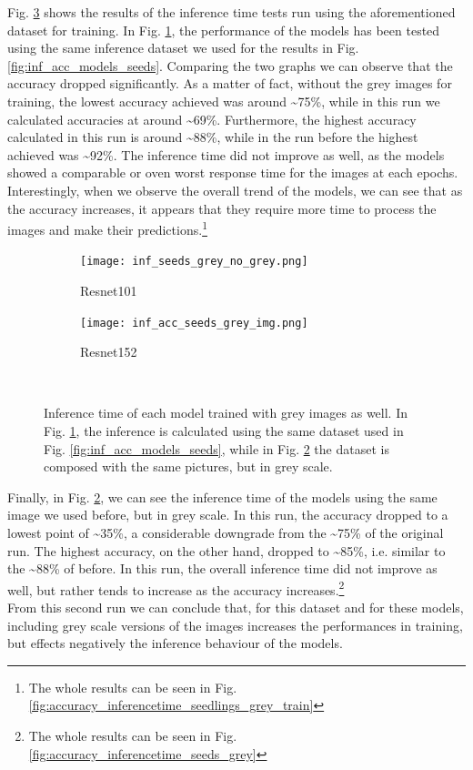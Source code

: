 Fig. \ref{fig:inf_seeds_with_grey} shows the results of the inference time tests run using the aforementioned dataset for training. In Fig. \ref{fig:inf_seeds_grey_no_grey}, the performance of the models has been tested using the same inference dataset we used for the results in Fig. \ref{fig:inf_acc_models_seeds}. Comparing the two graphs we can observe that the accuracy dropped significantly. As a matter of fact, without the grey images for training, the lowest accuracy achieved was around \textasciitilde75\%, while in this run we calculated accuracies at around \textasciitilde69\%. Furthermore, the highest accuracy calculated in this run is around \textasciitilde88\%,
while in the run before the highest achieved was \textasciitilde92\%. The inference time did not improve as well, as the models showed a comparable or oven worst response time for the images at each epochs. Interestingly, when we observe the overall trend of the models, we can see that as the accuracy increases, it appears that they require more time to process the images and make their predictions.\footnote{The whole results can be seen in Fig. \ref{fig:accuracy_inferencetime_seedlings_grey_train}}


\begin{figure}[h]
     \begin{subfigure}{0.5\textwidth}
	    \texttt{[image: inf\_seeds\_grey\_no\_grey.png]}
	    \caption{Resnet101}
         \label{fig:inf_seeds_grey_no_grey}
     \end{subfigure}
     \hfill
     \begin{subfigure}{0.5\textwidth}
	    \texttt{[image: inf\_acc\_seeds\_grey\_img.png]}
	    \caption{Resnet152}
        \label{fig:inf_acc_seeds_grey_img}
     \end{subfigure}\\
     \caption[Inference time of each model trained with grey images as well]{Inference time of each model trained with grey images as well. In Fig. \ref{fig:inf_seeds_grey_no_grey}, the inference is calculated using the same dataset used in Fig. \ref{fig:inf_acc_models_seeds}, while in Fig.  \ref{fig:inf_acc_seeds_grey_img} the dataset is composed with the same pictures, but in grey scale. }
        \label{fig:inf_seeds_with_grey}
\end{figure}


Finally, in Fig. \ref{fig:inf_acc_seeds_grey_img}, we can see the inference time of the models using the same image we used before, but in grey scale. In this run, the accuracy dropped to a lowest point of \textasciitilde35\%, a considerable downgrade from the \textasciitilde75\% of the original run. The highest accuracy, on the other hand, dropped to \textasciitilde85\%, i.e. similar to the \textasciitilde88\% of before. In this run, the overall inference time did not improve as well, but rather tends to increase as the accuracy increases.\footnote{The whole results can be seen in Fig. \ref{fig:accuracy_inferencetime_seeds_grey}} \\ 
From this second run we can conclude that, for this dataset and for these models, including grey scale versions of the images increases the performances in training, but effects negatively the inference behaviour of the models. 

